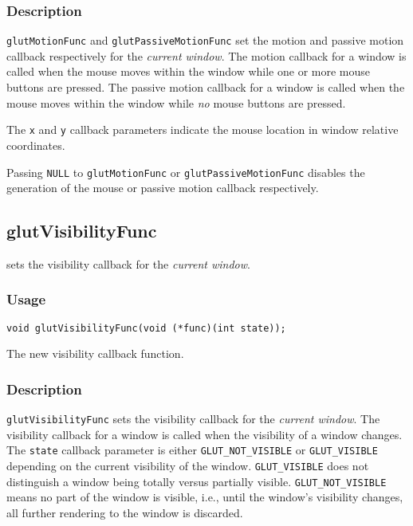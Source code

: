 \subsubsection*{Description}

{\tt glutMotionFunc} and {\tt glutPassiveMotionFunc} set the motion and
passive motion callback respectively for the {\em current window}.
The motion callback for a window is called when the mouse moves
within the window while one or more mouse buttons are pressed.  The
passive motion callback for a window is called when the mouse moves
within the window while {\em no} mouse buttons are pressed.

The {\tt x} and {\tt y} callback parameters indicate the mouse location
in window relative coordinates.

Passing {\tt NULL} to {\tt glutMotionFunc} or {\tt glutPassiveMotionFunc}
disables the generation of the mouse or passive motion callback
respectively.

\subsection{glutVisibilityFunc}

 sets the visibility callback for the {\em
current window}.

\subsubsection*{Usage}
\begin{verbatim}
void glutVisibilityFunc(void (*func)(int state));
\end{verbatim}
\begin{description}
\itemsep 0in
\item[{\tt func}]
The new visibility callback function.
\end{description}

\subsubsection*{Description}

{\tt glutVisibilityFunc} sets the visibility callback for the {\em
current window}.  The visibility callback for a window is called when
the visibility of a window changes.  The {\tt state} callback parameter
is either {\tt GLUT\_NOT\_VISIBLE} or {\tt GLUT\_VISIBLE} depending on
the current visibility of the window.  {\tt GLUT\_VISIBLE} does not
distinguish a window being totally versus partially visible.  {\tt GLUT\_NOT\_VISIBLE}
means no part of the window is visible, i.e., until the window's visibility changes,
all further rendering to the window is discarded.

